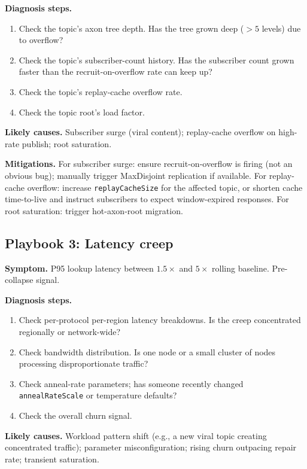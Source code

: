 \documentclass[twoside,nobib]{tufte-book}
\begin{document}
\textbf{Diagnosis steps.}
\begin{enumerate}\setlength\itemsep{0.05em}
  \item Check the topic's axon tree depth. Has the tree grown
    deep ($> 5$ levels) due to overflow?
  \item Check the topic's subscriber-count history. Has the
    subscriber count grown faster than the recruit-on-overflow
    rate can keep up?
  \item Check the topic's replay-cache overflow rate.
  \item Check the topic root's load factor.
\end{enumerate}

\textbf{Likely causes.} Subscriber surge (viral content);
replay-cache overflow on high-rate publish; root saturation.

\textbf{Mitigations.} For subscriber surge: ensure
recruit-on-overflow is firing (not an obvious bug); manually
trigger MaxDisjoint replication if available. For replay-cache
overflow: increase \texttt{replayCacheSize} for the affected
topic, or shorten cache time-to-live and instruct subscribers to
expect window-expired responses. For root saturation: trigger
hot-axon-root migration.

\subsection*{Playbook 3: Latency creep}
\label{sec:playbook-creep}

\textbf{Symptom.} P95 lookup latency between $1.5\times$ and
$5\times$ rolling baseline. Pre-collapse signal.

\textbf{Diagnosis steps.}
\begin{enumerate}\setlength\itemsep{0.05em}
  \item Check per-protocol per-region latency breakdowns. Is
    the creep concentrated regionally or network-wide?
  \item Check bandwidth distribution. Is one node or a small
    cluster of nodes processing disproportionate traffic?
  \item Check anneal-rate parameters; has someone recently
    changed \texttt{annealRateScale} or temperature defaults?
  \item Check the overall churn signal.
\end{enumerate}

\textbf{Likely causes.} Workload pattern shift (e.g., a new
viral topic creating concentrated traffic); parameter
misconfiguration; rising churn outpacing repair rate; transient
saturation.
\end{document}
